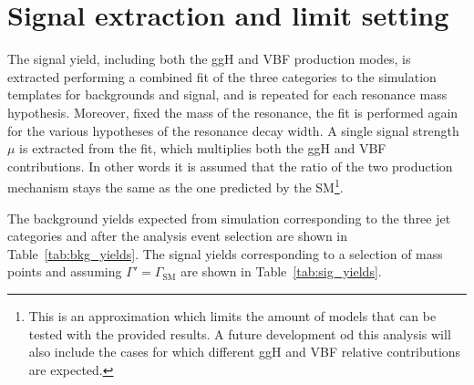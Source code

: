 \section{Signal extraction and limit setting}\label{chap6:SignalExtractionAndLimits}

The signal yield, including both the ggH and VBF production modes, is extracted performing a combined fit of the three categories to the \mti simulation templates for backgrounds and signal, and is repeated for each resonance mass hypothesis. Moreover, fixed the mass of the resonance, the fit is performed again for the various hypotheses of the resonance decay width. A single signal strength $\mu$ is extracted from the fit, which multiplies both the ggH and VBF contributions. In other words it is assumed that the ratio of the two production mechanism stays the same as the one predicted by the SM\footnote{This is an approximation which limits the amount of models that can be tested with the provided results. A future development od this analysis will also include the cases for which different ggH and VBF relative contributions are expected.}.

The background yields expected from simulation corresponding to the three jet categories and after the analysis event selection are shown in Table~\ref{tab:bkg_yields}. The signal yields corresponding to a selection of mass points and assuming $\Gamma' = \Gamma_\mathrm{SM}$ are shown in Table~\ref{tab:sig_yields}.

